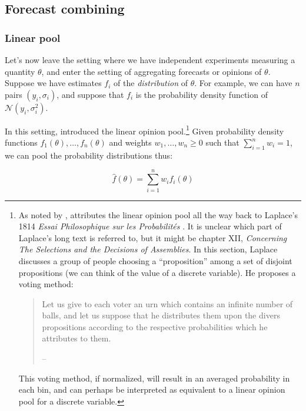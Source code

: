 \documentclass[12pt]{article}
\begin{document}

\subsection{Forecast combining}

\subsubsection{Linear pool}

Let's now leave the setting where we have independent experiments measuring a quantity $\theta$, and enter the setting of aggregating forecasts or opinions of $\theta$. Suppose we have estimates $f_i$ of the \emph{distribution} of $\theta$. For example, we can have $n$ pairs $(y_i,\sigma_i)$, and suppose that $f_i$ is the probability density function of $\mathcal{N}(y_i,\sigma_i^2)$.

In this setting, \cite{stone1961opinion} introduced the linear opinion pool.\footnote{As noted by \cite{koepke2017consensus}, \cite{bacharach1979normal} attributes the linear opinion pool all the way back to Laplace's 1814 \emph{Essai Philosophique sur les Probabilités} \citep{laplace1951essay}. It is unclear which part of Laplace's long text is referred to, but it might be chapter XII, \emph{Concerning The Selections and the Decisions of Assemblies}. In this section, Laplace discusses a group of people choosing a ``proposition'' among a set of disjoint propositions (we can think of the value of a discrete variable). He proposes a voting method:
  \begin{quote}Let us give to each voter an urn which contains an infinite number of balls, and let us suppose that he distributes them upon the divers propositions according to the respective probabilities which he attributes to them.

  \hfill -- \citet[pg. 130]{laplace1951essay}\end{quote}

  This voting method, if normalized, will result in an averaged probability in each bin, and can perhaps be interpreted as equivalent to a linear opinion pool for a discrete variable.} Given probability density functions $f_1(\theta),\ldots,f_n(\theta)$ and weights $w_1,\ldots,w_n\geq 0$ such that $\sum_{i=1}^n w_i=1$, we can pool the probability distributions thus:

\[\hat f(\theta)=\sum_{i=1}^n w_if_i(\theta)\]
\end{document}
